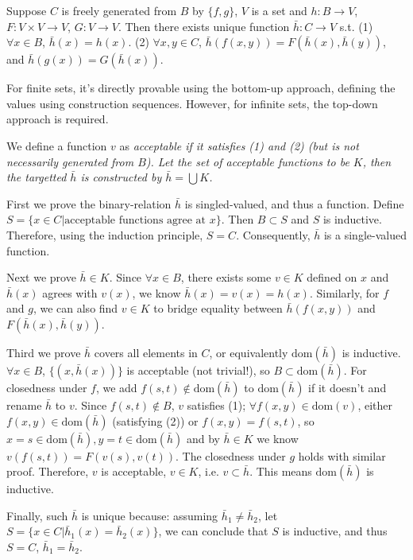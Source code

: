 \documentclass{article}
\newcommand \dom[1]					{\text{dom}\left( #1 \right)}
\begin{document}
	Suppose $C$ is freely generated from $B$ by $\{f, g\}$, $V$ is a set and $h:B\to V$, $F:V\times V\to V$, $G:V\to V$. Then there exists unique function $\bar{h}:C\to V$ s.t. (1) $\forall x \in B$, $\bar{h}(x)=h(x)$. (2) $\forall x,y \in C$, $\bar{h}\left( f(x,y) \right)=F \left( \bar{h}(x), \bar{h}(y) \right)$, and $\bar{h}(g(x))=G \left( \bar{h}(x) \right)$.

\Proof
	For finite sets, it's directly provable using the bottom-up approach, defining the values using construction sequences. However, for infinite sets, the top-down approach is required.
	
	We define a function $v$ as \it{acceptable} if it satisfies (1) and (2) (but is not necessarily generated from $B$). Let the set of acceptable functions to be $K$, then the targetted $\bar{h}$ is constructed by $\bar{h}=\bigcup K$.
	
	First we prove the binary-relation $\bar{h}$ is singled-valued, and thus a function. Define $S=\{x\in C| \text{acceptable functions agree at }x\}$. Then $B \subset S$ and $S$ is inductive. Therefore, using the induction principle, $S=C$. Consequently, $\bar{h}$ is a single-valued function.
	
	Next we prove $\bar{h}\in K$. Since $\forall x\in B$, there exists some $v \in K$ defined on $x$ and $\bar{h}(x)$ agrees with $v(x)$, we know $\bar{h}(x)=v(x)=h(x)$. Similarly, for $f$ and $g$, we can also find $v \in K$ to bridge equality between $\bar{h}(f(x,y))$ and $F \left( \bar{h}(x), \bar{h}(y) \right)$.
	
	Third we prove $\bar{h}$ covers all elements in $C$, or equivalently $\dom{\bar{h}}$ is inductive. $\forall x \in B$, $\{ \left( x, \bar{h}(x) \right) \}$ is acceptable (not trivial!), so $B \subset \dom{\bar{h}}$. For closedness under $f$, we add $f(s,t) \not\in \dom{\bar{h}}$ to $\dom{\bar{h}}$ if it doesn't and rename $\bar{h}$ to $v$. Since $f(s,t) \not\in B$, $v$ satisfies (1); $\forall f(x,y) \in \dom{v}$, either $f(x,y) \in \dom{\bar{h}}$ (satisfying (2)) or $f(x,y)=f(s,t)$, so $x=s \in \dom{\bar{h}}, y=t \in \dom{\bar{h}}$ and by $\bar{h} \in K$ we know $v(f(s,t))=F(v(s),v(t))$. The closedness under $g$ holds with similar proof. Therefore, $v$ is acceptable, $v\in K$, i.e. $v \subset \bar{h}$. This means $\dom{\bar{h}}$ is inductive.
	
	Finally, such $\bar{h}$ is unique because: assuming $\bar{h}_1 \ne \bar{h}_2$, let $S=\{x \in C| \bar{h}_1(x)=\bar{h}_2(x)\}$, we can conclude that $S$ is inductive, and thus $S=C$, $\bar{h}_1=\bar{h}_2$.
\end{document}

